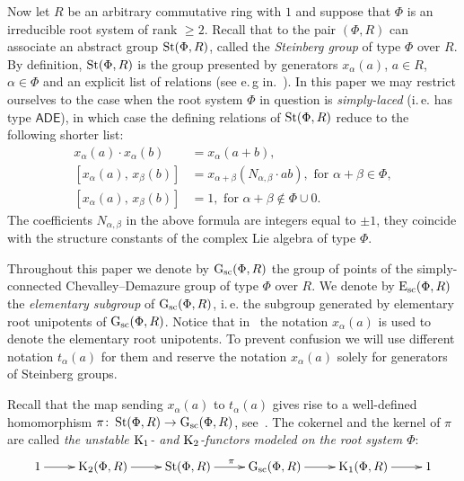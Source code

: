 Now let $R$ be an arbitrary commutative ring with $1$ and suppose that $\Phi$ is an irreducible root system of rank $\geq 2$.
Recall that to the pair $(\Phi, R)$ can associate an abstract group $\operatorname{St}(\Phi, R)$, called the \textit{Steinberg group} of type $\Phi$ over $R$.
By definition, $\operatorname{St}(\Phi, R)$ is the group presented by generators $x_\alpha(a)$, $a \in R$, $\alpha \in \Phi$ and an explicit list of relations (see e.\,g in.~\cite{Ma69, Re75, St71}).
In this paper we may restrict ourselves to the case when the root system $\Phi$ in question is \textit{simply-laced} (i.\,e. has type $\mathsf{ADE}$),
 in which case the defining relations of $\operatorname{St}(\Phi, R)$ reduce to the following shorter list:
\begin{align}
x_{\alpha}(a)\cdot x_{\alpha}(b)&=x_{\alpha}(a+b), \tag{R1} \label{x-additivity}\\
[x_{\alpha}(a),\,x_{\beta}(b)]  &=x_{\alpha+\beta}(N_{\alpha,\beta} \cdot ab),\text{ for }\alpha+\beta\in\Phi, \tag{R2} \label{R2} \\
[x_{\alpha}(a),\,x_{\beta}(b)]  &=1,\text{ for }\alpha+\beta\not\in\Phi\cup0. \tag{R3} \label{R3}
\end{align}
The coefficients $N_{\alpha,\beta}$ in the above formula are integers equal to $\pm 1$, they coincide with the structure constants of the complex Lie algebra of type $\Phi$.

Throughout this paper we denote by $\operatorname{G}_\mathrm{sc}(\Phi, R)$ the group of points of the simply-connected Chevalley--Demazure group of type $\Phi$ over $R$.
We denote by $\operatorname{E}_\mathrm{sc}(\Phi, R)$ the \textit{elementary subgroup} of $\operatorname{G}_\mathrm{sc}(\Phi, R)$, i.\,e. the subgroup generated by elementary root unipotents of $\operatorname{G}_\mathrm{sc}(\Phi, R)$.
Notice that in~\cite{VP, Vav09} the notation $x_\alpha(a)$ is used to denote the elementary root unipotents.
To prevent confusion we will use different notation $t_\alpha(a)$ for them and reserve the notation $x_\alpha(a)$ solely for generators of Steinberg groups.

Recall that the map sending $x_\alpha(a)$ to $t_\alpha(a)$ gives rise to a well-defined homomorphism $\pi \colon \operatorname{St}(\Phi, R) \to \operatorname{G}_\mathrm{sc}(\Phi, R)$, see~\cite[\S~1A]{St78}.
The cokernel and the kernel of $\pi$ are called \textit{the unstable $\operatorname{K}_1$- and $\operatorname{K}_2$-functors modeled on the root system $\Phi$}:
\begin{equation} \label{eq:K1-K2-sequence}
  \xymatrix{ 1 \ar[r] & \K_2(\Phi, R) \ar[r] & \St(\Phi, R) \ar[r]^{\pi} & \Gsc(\Phi, R) \ar[r] & \K_1(\Phi, R) \ar[r] & 1}
\end{equation}

